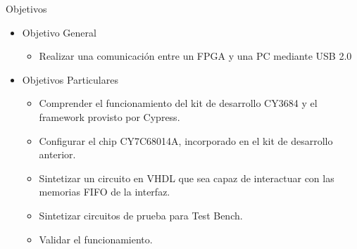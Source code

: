 \begin{frame}{Objetivos}
	\begin{itemize}
		\item Objetivo General
		\begin{itemize}
			\item Realizar una comunicación entre un FPGA y una PC mediante USB 2.0
		\end{itemize}
		\item Objetivos Particulares
		\begin{itemize}
			\item Comprender el funcionamiento del kit de desarrollo CY3684 y el framework provisto por Cypress.
			\item Configurar el chip CY7C68014A, incorporado en el kit de desarrollo anterior.
			\item Sintetizar un circuito en VHDL que sea capaz de interactuar con las memorias FIFO de la interfaz.
			\item Sintetizar circuitos de prueba para Test Bench.
			\item Validar el funcionamiento.
		\end{itemize}
	\end{itemize}
\end{frame}
